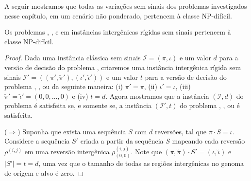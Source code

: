 A seguir mostramos que todas as variações sem sinais dos problemas investigados nesse capítulo, em um cenário não ponderado, pertencem à classe NP-difícil.

\begin{theorem}\label{theorem:YARJETHG}
Os problemas \SbIR{}, \SbIRI{}, \SbIRM{} e \SbIRMI{} em instâncias intergênicas rígidas sem sinais pertencem à classe NP-difícil.
\end{theorem}
\begin{proof}
Dada uma instância clássica sem sinais $\mathcal{I}=(\pi,\iota)$ e um valor $d$ para a versão de decisão do problema \SbR, criaremos uma instância intergênica rígida sem sinais $\mathcal{I'}=((\pi',\breve\pi'),(\iota',\breve\iota'))$ e um valor $t$ para a versão de decisão do problema \SbIR{}, \SbIRI{}, \SbIRM{} ou \SbIRMI{} da seguinte maneira: (i) $\pi' = \pi$, (ii) $\iota' = \iota$, (iii) $\breve\pi' = \breve\iota' = (0,0,\dots,0)$ e (iv) $t = d$. Agora mostramos que a instância $(\mathcal{I},d)$ do problema \SbR{} é satisfeita se, e somente se, a instância $(\mathcal{I'},t)$ do problema \SbIR{}, \SbIRI{}, \SbIRM{} ou \SbIRMI{} é satisfeita.

($\Rightarrow$) Suponha que exista uma sequência $S$ com $d$ reversões, tal que $\pi \cdot S = \iota$. Considere a sequência $S'$ criada a partir da sequência $S$ mapeando cada reversão $\rho^{(i,j)}$ em uma reversão intergênica $\rho^{(i,j)}_{(0,0)}$. Note que $(\pi,\breve\pi) \cdot S' = (\iota,\breve\iota)$ e $|S'| = t = d$, uma vez que o tamanho de todas as regiões intergênicas no genoma de origem e alvo é zero.


\end{proof}
